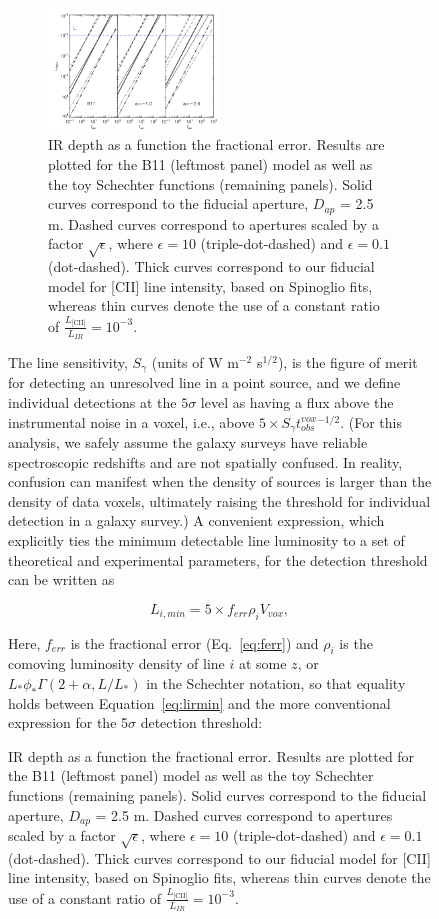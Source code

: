 \documentclass[iop,twocolappendix]{emulateapj}
\begin{document}
\begin{figure}[t]
\begin{figure}
\centering
\includegraphics[width=0.5\textwidth]{lirmin_ferr_b11_alpham1p0_alpham2p0_lstar1d12}
\caption{IR depth as a function the fractional error. Results are plotted for the B11 (leftmost panel) model as well as the toy Schechter functions (remaining panels). Solid curves correspond to the fiducial aperture, $D_{ap}$ = 2.5 m. Dashed curves correspond to apertures scaled by a factor $\sqrt{\epsilon}$, where $\epsilon=10$ (triple-dot-dashed) and $\epsilon=0.1$ (dot-dashed). Thick curves correspond to our fiducial model for [CII] line intensity, based on Spinoglio fits, whereas thin curves denote the use of a constant ratio of $\frac{L_{\textrm{[CII]}}}{L_{IR}} = 10^{-3}$.}
\label{fig:lirmin_ferr}
\end{figure}

The line sensitivity, $S_{\gamma}$ (units of W m$^{-2}$ s$^{1/2}$), is the figure of merit for detecting an unresolved line in a point source, and we define individual detections at the $5\sigma$ level as having a flux above the instrumental noise in a voxel, i.e., above $5 \times S_{\gamma} t_{obs}^{vox}^{-1/2}$. (For this analysis, we safely assume the galaxy surveys have reliable spectroscopic redshifts and are not spatially confused. In reality, confusion can manifest when the density of sources is larger than the density of data voxels, ultimately raising the threshold for individual detection in a galaxy survey.) A convenient expression, which explicitly ties the minimum detectable line luminosity to a set of theoretical and experimental parameters, for the detection threshold can be written as

\begin{equation}
L_{i, min} = 5 \times f_{err} \rho_{i} V_{vox}, 
\label{eq:lirmin}
\end{equation}

Here, $f_{err}$ is the fractional error (Eq.~\ref{eq:ferr}) and $\rho_{i}$ is the comoving luminosity density of line $i$ at some $z$, or $L_*\phi_* \Gamma(2+\alpha, L/L_*)$ in the Schechter notation, so that equality holds between Equation~\ref{eq:lirmin} and the more conventional expression for the 5$\sigma$ detection threshold:


\end{figure}
\end{document}
